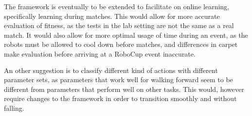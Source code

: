 \documentclass{article}
\begin{document}
The framework is eventually to be extended to facilitate on
online learning, specifically learning during matches.
This would allow for more accurate evaluation of fitness, as the tests in the 
lab setting are not the same as a real match. It would also allow for more
optimal usage of time during an event, as the robots must be allowed to cool
down before matches, and differences in carpet make evaluation before arriving
at a RoboCup event inaccurate.

An other suggestion is to classify different kind of actions with different
parameter sets, as parameters that work well for walking forward seem to be
different from parameters that perform well on other tasks. This would, however
require changes to the framework in order to transition smoothly and without
falling.




\end{document}
